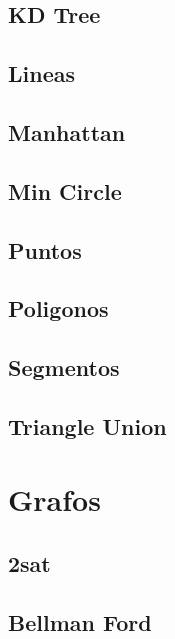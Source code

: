 \subsection{KD Tree}
\raggedbottom
\hrulefill
\subsection{Lineas}
\raggedbottom
\hrulefill
\subsection{Manhattan}
\raggedbottom
\hrulefill
\subsection{Min Circle}
\raggedbottom
\hrulefill
\subsection{Puntos}
\raggedbottom
\hrulefill
\subsection{Poligonos}
\raggedbottom
\hrulefill
\subsection{Segmentos}
\raggedbottom
\hrulefill
\subsection{Triangle Union}
\raggedbottom
\hrulefill

\section{Grafos}
\subsection{2sat}
\raggedbottom
\hrulefill
\subsection{Bellman Ford}
\raggedbottom
\hrulefill

